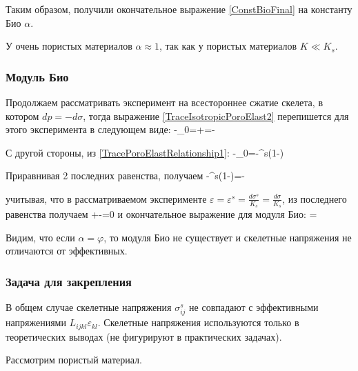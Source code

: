 \documentclass[main.tex]{subfiles}
\begin{document}
Таким образом, получили окончательное выражение \eqref{ConstBioFinal} на константу Био $\alpha$.

У очень пористых материалов $\alpha\approx1$, так как у пористых материалов $K\ll K_s$.

\subsubsection{Модуль Био}

Продолжаем рассматривать эксперимент на всестороннее сжатие скелета, в котором $dp=-d\sigma$, тогда выражение \eqref{TraceIsotropicPoroElast2} перепишется для этого эксперимента в следующем виде:
\beq
\varphi-\varphi_0=\alpha\varepsilon+=\alpha\varepsilon-
\eeq

С другой стороны, из \eqref{TracePoroElastRelationship1}:
\beq
\varphi-\varphi_0=\varepsilon-\varepsilon^s\left(1-\varphi\right)
\eeq

Приравнивая 2 последних равенства, получаем
\beq
\varepsilon-\varepsilon^s\left(1-\varphi\right)=\alpha\varepsilon-
\eeq

учитывая, что в рассматриваемом эксперименте $\displaystyle{}\varepsilon=\varepsilon^s=\frac{d\sigma^s}{K_s}=\frac{d\sigma}{K_s}$, из последнего равенства получаем
\beq
{}+-=0
\eeq
и окончательное выражение для модуля Био:
\beq
{}=
\eeq

Видим, что если $\alpha=\varphi$, то модуля Био не существует и скелетные напряжения не отличаются от эффективных.

\subsubsection{Задача для закрепления}

В общем случае скелетные напряжения $\sigma_{ij}^s$ не совпадают с эффективными напряжениями $L_{ijkl}\varepsilon_{kl}$. Скелетные напряжения используются только в теоретических выводах (не фигурируют в практических задачах).

Рассмотрим пористый материал.
\begin{figure}[h]
\centering
{}
\end{figure}
\end{document}
